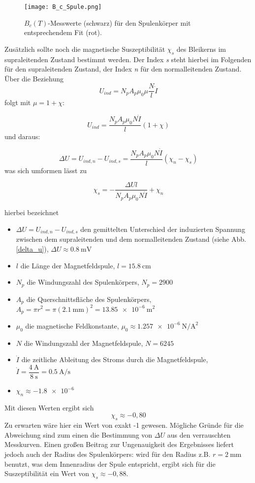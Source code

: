 \begin{figure}[H]
	\begin{center}
		\texttt{[image: B\_c\_Spule.png]}
		\caption{$B_{c}(T)$-Messwerte (schwarz) für den Spulenkörper mit  entsprechendem Fit (rot).}
		\label{B_c_Spule}
	\end{center}
\end{figure}

Zusätzlich sollte noch die magnetische Suszeptibilität $\chi_{s}$ des Bleikerns im supraleitenden Zustand bestimmt werden. Der Index \textit{s} steht hierbei im Folgenden für den supraleitenden Zustand, der Index \textit{n} für den normalleitenden Zustand.
Über die Beziehung
\[U_{ind}=N_{p}A_{p}\mu_{0}\mu \dfrac{N}{l}\dot{I} \]
folgt mit $\mu=1+\chi$:

\[U_{ind}=\dfrac{N_{p}A_{p}\mu_{0}N\dot{I}}{l}(1+\chi)\]
und daraus:

\[\Delta U=U_{ind,n}-U_{ind,s}=\dfrac{N_{p}A_{p}\mu_{0}N\dot{I}}{l}(\chi_{n}-\chi_{s})\]
was sich umformen lässt zu

\[\chi_{s}=-\dfrac{\Delta U l}{N_{p}A_{p}\mu_{0}N\dot{I}}+\chi_{n}\]

hierbei bezeichnet
\begin{itemize}
	\item $\Delta U=U_{ind,n}-U_{ind,s}$ den gemittelten Unterschied der induzierten Spannung zwischen dem supraleitenden und dem normalleitenden Zustand (siehe Abb. \ref{delta_u}), $\Delta U\approx\SI{0,8}{\milli\volt} $
	\item $l$ die Länge der Magnetfeldspule, $l=\SI{15,8}{\centi\meter}$
	\item $N_{p}$ die Windungszahl des Spulenkörpers, $N_{p}=2900$
	\item $A_{p}$ die Querschnittsfläche des Spulenkörpers, $A_{p}=\pi r^2=\pi (\SI{2,1}{\milli\meter})^2=\SI{13,85e-6}{\square\meter}$
	\item $\mu_{0}$ die magnetische Feldkonstante, $\mu_{0}\approx\SI{1,257e-6}{\newton\per\square\ampere}$
	\item $N$ die Windungszahl der Magnetfeldspule, $N=6245$
	\item $\dot{I}$ die zeitliche Ableitung des Stroms durch die Magnetfeldspule, $\dot{I}=\dfrac{\SI{4}{\ampere}}{\SI{8}{\second}}=\SI{0,5}{\ampere\per\second}$
	\item$\chi_{n}\approx\SI{-1,8e-6}{}$
	\end{itemize}

Mit diesen Werten ergibt sich
\[\chi_{s}\approx-0,80\]
Zu erwarten wäre hier ein Wert von exakt -1 gewesen. Mögliche Gründe für die Abweichung sind zum einen die Bestimmung von $\Delta U$ aus den verrauschten Messkurven. Einen großen Beitrag zur Ungenauigkeit des Ergebnisses liefert jedoch auch der Radius des Spulenkörpers: wird für den Radius z.B. $r=\SI{2}{\milli\meter}$ benutzt, was dem Innenradius der Spule entspricht, ergibt sich für die Suszeptibilität ein Wert von $\chi_{s}\approx-0,88$.

